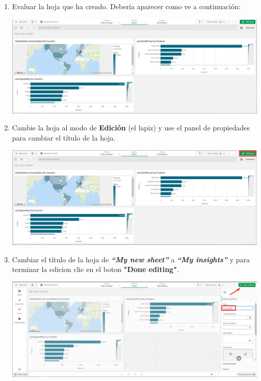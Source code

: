 \documentclass[12pt,letterpaper]{article}
\newcommand\tab[1][1cm]{\hspace*{#1}}
\begin{document}
\begin{enumerate}[\tab 1.]
\begin{center}
        \end{center}
        \item Evaluar la hoja que ha creado. Debería aparecer como ve a continuación:
        \begin{center}
            \includegraphics[width=13cm]{./img/img13.png}
        \end{center}
        \item Cambie la hoja al modo de \textbf{Edición} (el lapiz) y use el panel de propiedades para cambiar el título de la hoja.
        \begin{center}
            \includegraphics[width=13cm]{./img/img14.png}
        \end{center}
        \item Cambiar el título de la hoja de \textit{\textbf{“My new sheet”}} a \textit{\textbf{“My insights”}} y para terminar la edicion  clic en el boton \textbf{"Done editing"}.
        \begin{center}
            \includegraphics[width=13cm]{./img/img15.png}
        \end{center}
    \end{enumerate}
\end{document}
